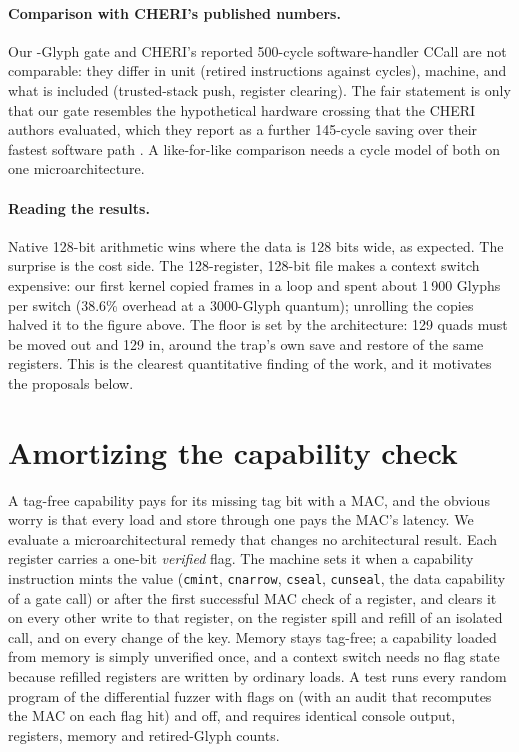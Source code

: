 \documentclass[10pt,a4paper]{article}
\begin{document}
\paragraph{Comparison with CHERI's published numbers.} Our \GateCall{}-Glyph gate and CHERI's reported 500-cycle software-handler CCall are not comparable: they differ in unit (retired instructions against cycles), machine, and what is included (trusted-stack push, register clearing). The fair statement is only that our gate resembles the hypothetical hardware crossing that the CHERI authors evaluated, which they report as a further 145-cycle saving over their fastest software path \citep{cheridomain}. A like-for-like comparison needs a cycle model of both on one microarchitecture.
\paragraph{Reading the results.} Native 128-bit arithmetic wins where the data is 128 bits wide, as expected. The surprise is the cost side. The 128-register, 128-bit file makes a context switch expensive: our first kernel copied frames in a loop and spent about 1\,900 Glyphs per switch (38.6\% overhead at a 3000-Glyph quantum); unrolling the copies halved it to the figure above. The floor is set by the architecture: 129 quads must be moved out and 129 in, around the trap's own save and restore of the same registers. This is the clearest quantitative finding of the work, and it motivates the proposals below.

\section{Amortizing the capability check}\label{sec:amortize}
A tag-free capability pays for its missing tag bit with a MAC, and the obvious worry is that every load and store through one pays the MAC's latency. We evaluate a microarchitectural remedy that changes no architectural result. Each register carries a one-bit \emph{verified} flag. The machine sets it when a capability instruction mints the value (\texttt{cmint}, \texttt{cnarrow}, \texttt{cseal}, \texttt{cunseal}, the data capability of a gate call) or after the first successful MAC check of a register, and clears it on every other write to that register, on the register spill and refill of an isolated call, and on every change of the key. Memory stays tag-free; a capability loaded from memory is simply unverified once, and a context switch needs no flag state because refilled registers are written by ordinary loads. A test runs every random program of the differential fuzzer with flags on (with an audit that recomputes the MAC on each flag hit) and off, and requires identical console output, registers, memory and retired-Glyph counts.
\end{document}
